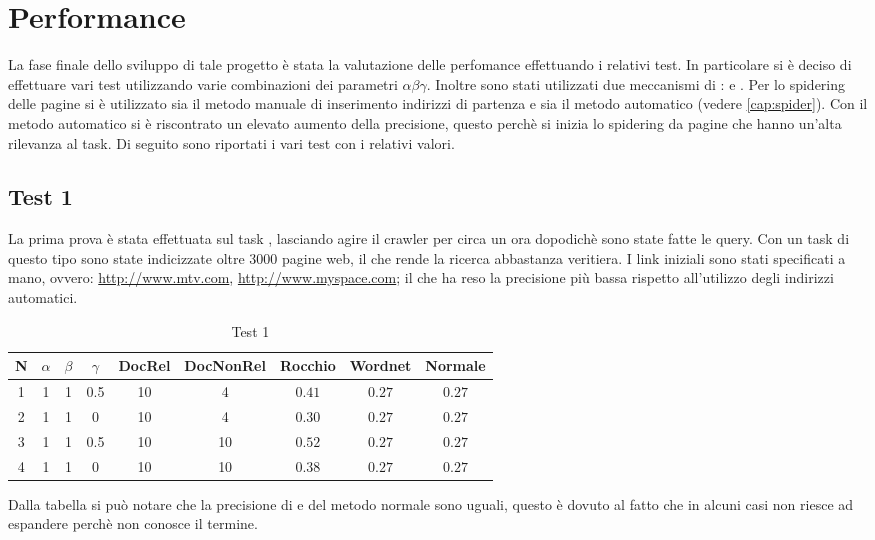 \chapter{Performance}
La fase finale dello sviluppo di tale progetto è stata la valutazione delle perfomance effettuando i relativi test. In particolare si è deciso di effettuare vari test utilizzando varie combinazioni dei parametri $\alpha \beta \gamma$. Inoltre sono stati utilizzati due meccanismi di :  e . Per lo spidering delle pagine si è utilizzato sia il metodo manuale di inserimento indirizzi di partenza e sia il metodo automatico (vedere \ref{cap:spider}). Con il metodo automatico si è riscontrato un elevato aumento della precisione, questo perchè si inizia lo spidering da pagine che hanno un'alta rilevanza al task.
Di seguito sono riportati i vari test con i relativi valori.
\section{Test 1}
La prima prova è stata effettuata sul task , lasciando agire il crawler per circa un ora dopodichè sono state fatte le query. Con un task di questo tipo sono state indicizzate oltre 3000 pagine web, il che rende la ricerca abbastanza veritiera. I link iniziali sono stati specificati a mano, ovvero: \url{http://www.mtv.com}, \url{http://www.myspace.com}; il che ha reso la precisione più bassa rispetto all'utilizzo degli indirizzi automatici.
\begin{table}[H]
\begin{center}
\begin{tabular}{||c|c|c|c|c|c|c|c|c||}
\hline
N	&$\alpha$	&$\beta$	&$\gamma$	&DocRel		&DocNonRel	&Rocchio	&Wordnet	&Normale	\\
\hline
\hline
1	&1			&1			&0.5		&10			&4			&$0.41$		&$0.27$		&$0.27$	\\
\hline
2	&1			&1			&0			&10			&4			&$0.30$		&$0.27$		&$0.27$	\\
\hline
3	&1			&1			&0.5		&10			&10			&$0.52$		&$0.27$		&$0.27$	\\
\hline
4	&1			&1			&0			&10			&10			&$0.38$		&$0.27$		&$0.27$	\\
\hline
\end{tabular}
\end{center}
\caption{Test 1}
\label{test_1}
\end{table}
Dalla tabella si può notare che la precisione di  e del metodo normale sono uguali, questo è dovuto al fatto che  in alcuni casi non riesce ad espandere perchè non conosce il termine.
